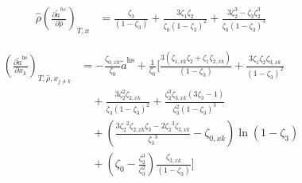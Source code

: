 \documentclass[12pt, letterpaper]{article}
\begin{document}
\begin{equation}
    \begin{aligned}
        \hat{\rho}\left(\frac{\partial\tilde{a}^{hs}}{\partial\hat{\rho}}\right)_{T,x}
        &=
        \frac{\zeta_{3}}{(1-\zeta_{3})}
        +\frac{3\zeta_{1}\zeta_{2}}{\zeta_{0}(1-\zeta_{3})^{2}}
        +\frac{3\zeta_{2}^{3}-\zeta_{3}\zeta_{2}^{3}}{\zeta_{0}(1-\zeta_{3})^{3}}
    \end{aligned}
    \label{eq:hs_ares_dadrho}
\end{equation}


\begin{equation}
    \begin{aligned}
        \left(\frac{\partial\tilde{a}^{\mathrm{hs}}}{\partial x_{k}}\right)_{T,\hat{\rho},x_{j\neq k}}
        &=- \frac{\zeta_{0,xk}}{\zeta_{0}}\tilde{a}^{\mathrm{hs}}+\frac{1}{\zeta_{0}}\biggl[
        \frac{3(\zeta_{1,xk}\zeta_{2}+\zeta_{1}\zeta_{2,xk})}{(1-\zeta_{3})}
        +\frac{3\zeta_{1}\zeta_{2}\zeta_{3,xk}}{\left(1-\zeta_{3}\right)^{2}}
        \\
        &\quad +\frac{3\zeta_{2}^{2}\zeta_{2,xk}}{\zeta_{3}(1-\zeta_{3})^{2}}
        +\frac{\zeta_{2}^{3}\zeta_{3,xk}(3\zeta_{3}-1)}{\zeta_{3}^{2}(1-\zeta_{3})^{3}}
        \\
        &\quad +\left(
        \frac{3{\zeta_{2}}^{2}{\zeta_{2,xk}}{\zeta_{3}}-2{\zeta_{2}}^{3}{\zeta_{3,xk}}}{{\zeta_{3}}^{3}}
        -{\zeta_{0,xk}}
        \right)\ln(1-{\zeta_{3}})
        \\
        &\quad +\left(\zeta_{0}-\frac{\zeta_{2}^{3}}{\zeta_{3}^{2}}\right)\frac{\zeta_{3,xk}}{(1-\zeta_{3})}
        \biggr]
    \end{aligned}
    \label{eq:hs_ares_dxk}
\end{equation}

\end{document}
